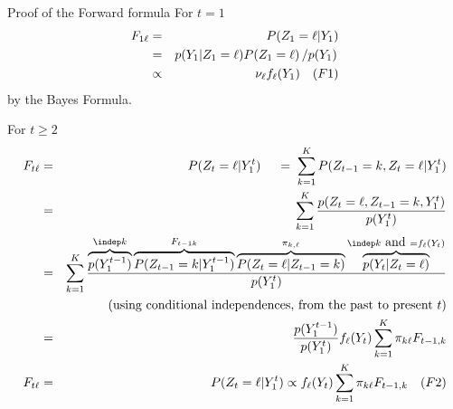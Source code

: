 \documentclass[compress,10pt]{beamer}
\begin{document}
\begin{frame}[allowframebreaks]{Proof of the Forward formula}
For $t=1$ 
  \begin{eqnarray*} 
  {F_{1\ell}} &=& P(Z_{1} = \ell|Y_1) \\
&=& p(Y_1|Z_1 = \ell) P(Z_1 = \ell) \left/p(Y_1) \right.\\
&\propto& \nu_\ell f_\ell(Y_1)   \quad (F1)
\end{eqnarray*}
by the Bayes Formula. 

For $t \geq 2$
  \begin{eqnarray*} 
    {F_{t\ell}} & = & P(Z_t =\ell| Y_1^t) \quad 
    \; = \; \sum_{k=1}^K P(Z_{t-1} = k, Z_t = \ell | Y_1^t) \\
    & = & \sum_{k=1}^K \frac{p(Z_t = \ell, Z_{t-1} = k, Y_1^t)}{p(Y_1^t)} \\ 
    & = &\sum_{k=1}^K \frac{
\overbrace{p(Y_1^{t-1})}^{\indep k} \overbrace{P(Z_{t-1} = k |Y_1^{t-1})}^{ {F_{t-1 k}} }  \overbrace{P(Z_ t =  \ell|Z_{t-1} = k)}^{\pi_{k,\ell}} \overbrace{p(Y_t | Z_t = \ell)}^{\indep k \mbox{ and }  = f_\ell(Y_t)} }{p(Y_1^t)}  \\
    & & \text{(using conditional independences, from the past to present $t$)} \\
    & = & \frac{p(Y_1^{t-1})}{p(Y_1^t)} {f_{\ell}(Y_t)  \sum_{k=1}^K \pi_{k \ell} F_{t-1, k}} \\
 F_{t\ell} &= & P(Z_t =\ell| Y_1^t)  \propto f_{\ell}(Y_t)  \sum_{k=1}^K \pi_{k \ell} F_{t-1, k}   \quad (F2)
  \end{eqnarray*}
\end{frame}
\end{document}
